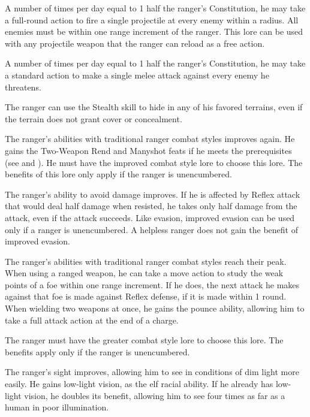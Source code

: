  A number of times per day equal to 1 \add half the ranger's Constitution, he may take a full-round action to fire a single projectile at every enemy within a \areamed radius. All enemies must be within one range increment of the ranger. This lore can be used with any projectile weapon that the ranger can reload as a free action.

 A number of times per day equal to 1 \add half the ranger's Constitution, he may take a standard action to make a single melee attack against every enemy he threatens.

\label{Camouflage} The ranger can use the Stealth skill to hide in any of his favored terrains, even if the terrain does not grant cover or concealment.

 The ranger's abilities with traditional ranger combat styles improves again. He gains the Two-Weapon Rend and Manyshot feats if he meets the prerequisites (see  and ). He must have the improved combat style lore to choose this lore. The benefits of this lore only apply if the ranger is unencumbered.

 The ranger's ability to avoid damage improves. If he is affected by Reflex attack that would deal half damage when resisted, he takes only half damage from the attack, even if the attack succeeds. Like evasion, improved evasion can be used only if a ranger is unencumbered. A helpless ranger does not gain the benefit of improved evasion.

 The ranger's abilities with traditional ranger combat styles reach their peak. When using a ranged weapon, he can take a move action to study the weak points of a foe within one range increment. If he does, the next attack he makes against that foe is made against Reflex defense, if it is made within 1 round. When wielding two weapons at once, he gains the pounce ability, allowing him to take a full attack action at the end of a charge.

The ranger must have the greater combat style lore to choose this lore. The benefits apply only if the ranger is unencumbered.

 The ranger's sight improves, allowing him to see in conditions of dim light more easily. He gains low-light vision, as the elf racial ability. If he already has low-light vision, he doubles its benefit, allowing him to see four times as far as a human in poor illumination.

